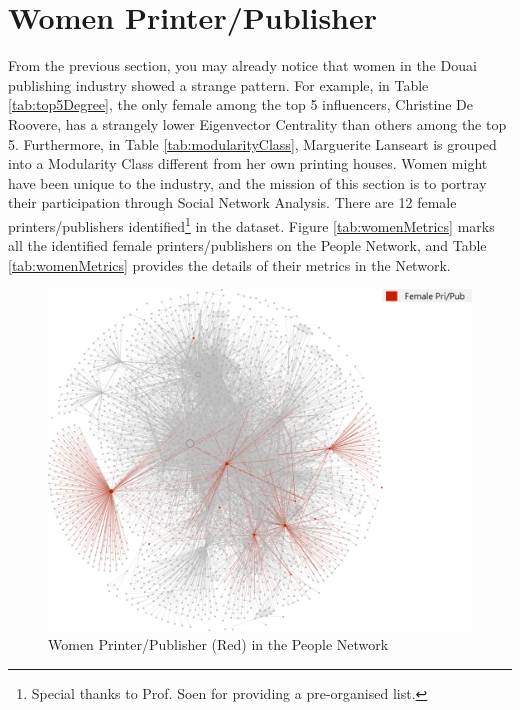 \documentclass[12pt,a4paper,oneside]{book}
\begin{document}
\begin{sloppypar}
\section{Women Printer/Publisher}
From the previous section, you may already notice that women in the Douai publishing industry showed a strange pattern. For example, in Table \ref{tab:top5Degree}, the only female among the top 5 influencers, Christine De Roovere, has a strangely lower Eigenvector Centrality than others among the top 5. Furthermore, in Table \ref{tab:modularityClass}, Marguerite Lanseart is grouped into a Modularity Class different from her own printing houses. Women might have been unique to the industry, and the mission of this section is to portray their participation through Social Network Analysis. There are 12 female printers/publishers identified\footnote{Special thanks to Prof. Soen for providing a pre-organised list.} in the dataset. Figure \ref{tab:womenMetrics} marks all the identified female printers/publishers on the People Network, and Table \ref{tab:womenMetrics} provides the details of their metrics in the Network.

\begin{figure}[H]
\centering
\includegraphics[scale=0.45]{graph/Women in the People Network.png}
\caption{Women Printer/Publisher (Red) in the People Network}
\label{fig:womenNet}
\end{figure}


\end{sloppypar}
\end{document}
